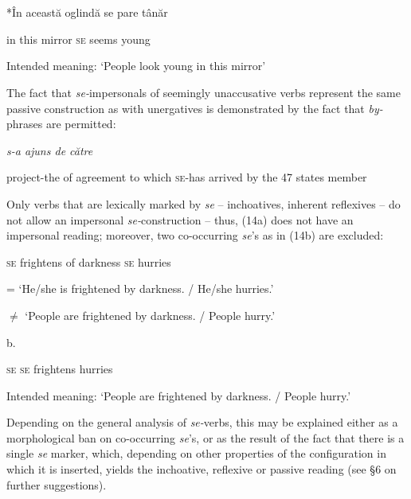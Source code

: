 \documentclass[output=paper]{langsci/langscibook}
\begin{document}
\ea%
    \label{ex:key:12}
    \gll\\
        \\
    \glt
    \z

          *În această oglindă se pare    tânăr

 in this       mirror   \textsc{se} seems young

Intended meaning: ‘People look young in this mirror’

The fact that \textit{se-}impersonals of seemingly unaccusative verbs represent the same passive construction as with unergatives is demonstrated by the fact that \textit{by-}phrases are permitted:

  \emph{s-a      ajuns    de către}\textstylest{} 

project-the of agreement to which \textsc{se-}has arrived by         the  47      states member 

 \textstylest{(}\textstylest{)}


Only verbs that are lexically marked by \textit{se} – inchoatives, inherent reflexives – do not allow an impersonal \textit{se-}construction – thus, (14a) does not have an impersonal reading; moreover, two co-occurring \textit{se}’s as in (14b) are excluded:

 

 \textsc{se} frightens of darkness                    \textsc{se} hurries

     = ‘He/she is frightened by darkness. / He/she hurries.’

      ${\neq}$ ‘People are frightened by darkness. / People hurry.’

b.   

          \textsc{se se}  frightens   hurries

         Intended meaning: ‘People are frightened by darkness. / People hurry.’

Depending on the general analysis of \textit{se-}verbs, this may be explained either as a morphological ban on co-occurring \textit{se}’s, or as the result of the fact that there is a single \textit{se} marker, which, depending on other properties of the configuration in which it is inserted, yields the inchoative, reflexive or passive reading (see §6 on further suggestions).
\end{document}
